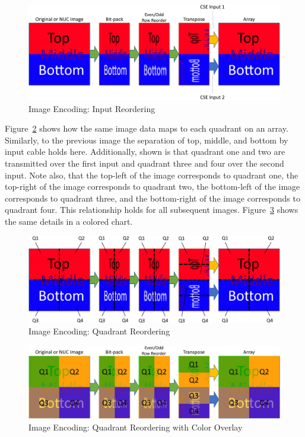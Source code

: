     \begin{figure}
        \centering
        \includegraphics[width=1.0\textwidth]{fig/image_encoding.pdf}
        \caption{Image Encoding: Input Reordering}
        \label{fig:image_encoding}
    \end{figure}

    Figure~\ref{fig:image_encoding_quads} shows how the same image data maps to each quadrant on an array. Similarly, to the previous image the separation of top, middle, and bottom by input cable holds here. Additionally, shown is that quadrant one and two are transmitted over the first input and quadrant three and four over the second input. Note also, that the top-left of the image corresponds to quadrant one, the top-right of the image corresponds to quadrant two, the bottom-left of the image corresponds to quadrant three, and the bottom-right of the image corresponds to quadrant four. This relationship holds for all subsequent images. Figure~\ref{fig:image_encoding_colored} shows the same details in a colored chart.

    \begin{figure}
        \centering
        \includegraphics[width=1.0\textwidth]{fig/image_encoding_quads.pdf}
        \caption{Image Encoding: Quadrant Reordering}
        \label{fig:image_encoding_quads}
    \end{figure}

    \begin{figure}
        \centering
        \includegraphics[width=1.0\textwidth]{fig/image_encoding_colored.pdf}
        \caption{Image Encoding: Quadrant Reordering with Color Overlay}
        \label{fig:image_encoding_colored}
    \end{figure}

